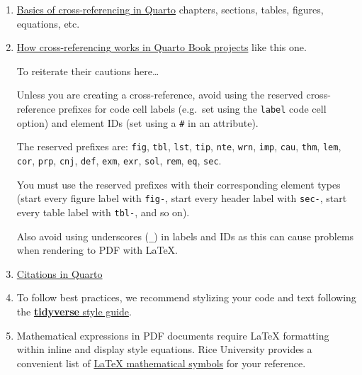 \documentclass[
  11pt,
  letterpaper,
  twoside]{report}
\begin{document}
\newpage{}

\begin{enumerate}
\def\labelenumi{\arabic{enumi}.}
\setcounter{enumi}{2}
\item
  \href{https://quarto.org/docs/authoring/cross-references.html}{Basics
  of cross-referencing in Quarto} chapters, sections, tables, figures,
  equations, etc.
\item
  \href{https://quarto.org/docs/books/book-crossrefs.html}{How
  cross-referencing works in Quarto Book projects} like this one.

  To reiterate their cautions here\ldots{}

  \begin{tcolorbox}[enhanced jigsaw, coltitle=black, leftrule=.75mm, titlerule=0mm, rightrule=.15mm, toprule=.15mm, opacityback=0, colbacktitle=quarto-callout-warning-color!10!white, breakable, colback=white, left=2mm, opacitybacktitle=0.6, bottomtitle=1mm, bottomrule=.15mm, colframe=quarto-callout-warning-color-frame, title=\textcolor{quarto-callout-warning-color}{\faExclamationTriangle}\hspace{0.5em}{Reserved prefixes for cross-referencing}, arc=.35mm, toptitle=1mm]

  Unless you are creating a cross-reference, avoid using the reserved
  cross-reference prefixes for code cell labels (e.g.~set using the
  \texttt{label} code cell option) and element IDs (set using a
  \texttt{\#} in an attribute).

  The reserved prefixes are: \texttt{fig}, \texttt{tbl}, \texttt{lst},
  \texttt{tip}, \texttt{nte}, \texttt{wrn}, \texttt{imp}, \texttt{cau},
  \texttt{thm}, \texttt{lem}, \texttt{cor}, \texttt{prp}, \texttt{cnj},
  \texttt{def}, \texttt{exm}, \texttt{exr}, \texttt{sol}, \texttt{rem},
  \texttt{eq}, \texttt{sec}.

  You must use the reserved prefixes with their corresponding element
  types (start every figure label with \texttt{fig-}, start every header
  label with \texttt{sec-}, start every table label with \texttt{tbl-},
  and so on).

  Also avoid using underscores (\texttt{\_}) in labels and IDs as this
  can cause problems when rendering to PDF with LaTeX.

  \end{tcolorbox}
\item
  \href{https://quarto.org/docs/authoring/citations.html}{Citations in
  Quarto}
\item
  To follow best practices, we recommend stylizing your code and text
  following the \href{https://style.tidyverse.org}{\textbf{tidyverse}
  style guide}.
\item
  Mathematical expressions in PDF documents require LaTeX formatting
  within inline and display style equations. Rice University provides a
  convenient list of
  \href{https://www.cmor-faculty.rice.edu/~heinken/latex/symbols.pdf}{LaTeX
  mathematical symbols} for your reference.


\end{enumerate}
\end{document}
